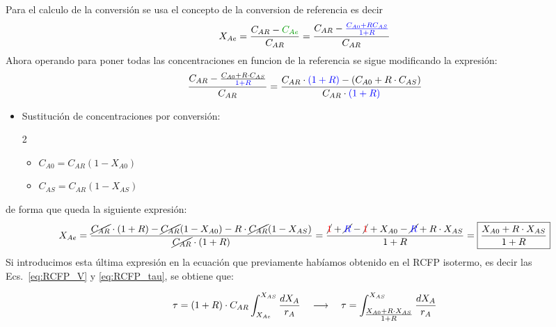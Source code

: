 \noindent Para el calculo de la conversión se usa el concepto de la conversion de referencia es decir
\begin{equation*}
    X_{Ae} = \frac{C_{AR}-\textcolor{darkgreen}{C_{Ae}}}{C_{AR}} = \frac{C_{AR}-\textcolor{blue}{ \frac{C_{A0}+R C_{AS}}{1+R}}}{C_{AR}}
\end{equation*}
\noindent Ahora operando para poner todas las concentraciones en funcion de la referencia se sigue modificando la expresión:
\begin{equation*}
    \frac{C_{AR}- \frac{C_{A0}+R \cdot C_{AS}}{\textcolor{blue}{1+R}}}{C_{AR}} = \frac{C_{AR}\cdot \textcolor{blue}{(1+R)} - (C_{A0} + R \cdot C_{AS})}{C_{AR}\cdot \textcolor{blue}{(1+R)}}
\end{equation*}
\begin{itemize}
    \item Sustitución de concentraciones por conversión:
          \begin{multicols}{2}
              \begin{itemize}
                  \item $C_{A0} = C_{AR}(1 - X_{A0})$
                  \item $C_{AS} = C_{AR}(1 - X_{AS})$
              \end{itemize}
          \end{multicols}
\end{itemize}

\noindent de forma que queda la siguiente expresión:
\begin{equation*}
    X_{Ae} = \frac{\cancel{C_{AR}} \cdot (1+R) - \cancel{C_{AR}}(1-X_{A0}) - R \cdot \cancel{C_{AR}}(1-X_{AS})}{\cancel{C_{AR}} \cdot (1+R)} = \frac{\cancel{\textcolor{red}{1}} + \cancel{\textcolor{blue}{R}} - \cancel{\textcolor{red}{1}} + X_{A0} - \cancel{\textcolor{blue}{R}} + R \cdot X_{AS}}{1+R} = \boxed{\frac{X_{A0} + R \cdot X_{AS}}{1+R}}
\end{equation*}
\vspace{1em}
\noindent Si introducimos esta última expresión en la ecuación que previamente habíamos obtenido en el RCFP isotermo, es decir las Ecs.~\eqref{eq:RCFP_V} y \eqref{eq:RCFP_tau}, se obtiene que:

\begin{equation}
    \tau = (1+R) \cdot C_{AR} \int_{X_{Ae}}^{X_{AS}}\frac{dX_A}{r_A} \quad \longrightarrow \quad \tau = \int_{\scalebox{1}{$\frac{X_{A0} + R \cdot X_{AS}}{1+R}$}}^{X_{AS}}\frac{dX_A}{r_A} \label{eq:RCFP_recirculacion_tau}
\end{equation}
\newpage

